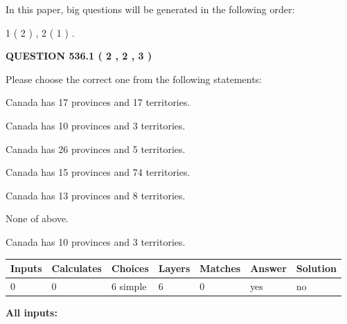 \documentclass[12pt]{article}
\begin{document}
In this paper, big questions will be generated in the following order: 
   
   
   1 ( 2 )
 ,
   2 ( 1 )
 .
  
\vspace{0.2in}
  
{\textbf{\Large{QUESTION
536.1 
 ( 2 , 2 , 3 )
}}}
  
  
Please choose the correct one from the following statements:
 
 
Canada has  17 provinces and  17 territories.
 
 
Canada has 10  provinces and 3 territories.
 
 
Canada has  26 provinces and  5 territories.
 
 
Canada has  15 provinces and  74 territories.
 
 
Canada has  13 provinces and  8 territories.
 
 
 None of above.
 
 
\noindent{}
 
 
Canada has 10  provinces and 3 territories.
 
 
\noindent{}
 
 
   
   
   
   
\noindent\begin{tabular}{|l|l|l|l|l|l|l|}
 \hline
Inputs & Calculates & Choices & Layers & Matches & Answer & Solution \\ \hline
 0  & 
 0  & 
 6
  simple  
  & 
 6  & 
 0  & 
  yes & 
  no 
  \\ \hline
 \end{tabular}
   
   
   
   
\noindent{}
   
   
   
   
\noindent\vspace{0.1in}\hspace{-0.08in} {\textbf{\Large{All inputs: }}}
   
\end{document}
